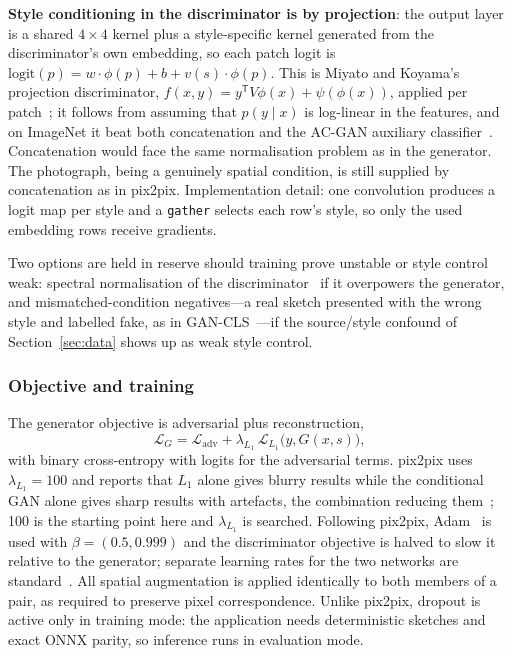 \documentclass[conference]{IEEEtran}
\begin{document}
\textbf{Style conditioning in the discriminator is by projection}: the output
layer is a shared $4\times4$ kernel plus a style-specific kernel generated from
the discriminator's own embedding, so each patch logit is
$\mathrm{logit}(p) = w \cdot \phi(p) + b + v(s) \cdot \phi(p)$. This is Miyato
and Koyama's projection discriminator,
$f(x,y) = y^{\mathsf{T}} V \phi(x) + \psi(\phi(x))$, applied per
patch~\cite{miyato2018cgans}; it follows from assuming that $p(y \mid x)$ is
log-linear in the features, and on ImageNet it beat both concatenation and the
AC-GAN auxiliary classifier~\cite{odena2017conditional}. Concatenation would face
the same normalisation problem as in the generator. The photograph, being a
genuinely spatial condition, is still supplied by concatenation as in pix2pix.
Implementation detail: one convolution produces a logit map per style and a
\texttt{gather} selects each row's style, so only the used embedding rows receive
gradients.

Two options are held in reserve should training prove unstable or style control
weak: spectral normalisation of the discriminator~\cite{miyato2018spectral} if it
overpowers the generator, and mismatched-condition negatives---a real sketch
presented with the wrong style and labelled fake, as in
GAN-CLS~\cite{reed2016generative}---if the source/style confound of
Section~\ref{sec:data} shows up as weak style control.

\subsubsection{Objective and training}

The generator objective is adversarial plus reconstruction,
\begin{equation}
  \mathcal{L}_G = \mathcal{L}_\text{adv} + \lambda_{L_1}\,\mathcal{L}_{L_1}\bigl(y, G(x,s)\bigr),
  \label{eq:ganloss}
\end{equation}
with binary cross-entropy with logits for the adversarial terms. pix2pix uses
$\lambda_{L_1} = 100$ and reports that $L_1$ alone gives blurry results while the
conditional GAN alone gives sharp results with artefacts, the combination
reducing them~\cite{isola2017image}; 100 is the starting point here and
$\lambda_{L_1}$ is searched. Following pix2pix, Adam~\cite{kingma2015adam} is
used with $\beta = (0.5, 0.999)$ and the discriminator objective is halved to
slow it relative to the generator; separate learning rates for the two networks
are standard~\cite{heusel2017gans}. All spatial augmentation is applied
identically to both members of a pair, as required to preserve pixel
correspondence. Unlike pix2pix, dropout is active only in training mode: the
application needs deterministic sketches and exact ONNX parity, so inference runs
in evaluation mode.
\end{document}

